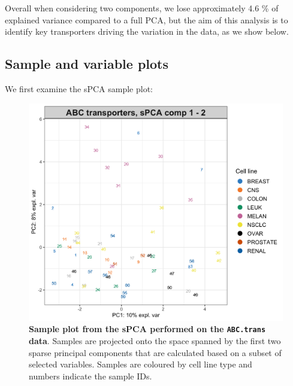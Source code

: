 \documentclass[]{book}
\newenvironment{Shaded}{\begin{snugshade}}{\end{snugshade}}
\newcommand{\CommentTok}[1]{\textcolor[rgb]{0.56,0.35,0.01}{\textit{#1}}}
\newcommand{\DataTypeTok}[1]{\textcolor[rgb]{0.13,0.29,0.53}{#1}}
\newcommand{\DecValTok}[1]{\textcolor[rgb]{0.00,0.00,0.81}{#1}}
\newcommand{\KeywordTok}[1]{\textcolor[rgb]{0.13,0.29,0.53}{\textbf{#1}}}
\newcommand{\NormalTok}[1]{#1}
\newcommand{\OperatorTok}[1]{\textcolor[rgb]{0.81,0.36,0.00}{\textbf{#1}}}
\newcommand{\OtherTok}[1]{\textcolor[rgb]{0.56,0.35,0.01}{#1}}
\newcommand{\StringTok}[1]{\textcolor[rgb]{0.31,0.60,0.02}{#1}}
\begin{document}
Overall when considering two components, we lose approximately 4.6 \% of explained variance compared to a full PCA, but the aim of this analysis is to identify key transporters driving the variation in the data, as we show below.

\hypertarget{sample-and-variable-plots}{%
\subsection{Sample and variable plots}\label{sample-and-variable-plots}}

We first examine the sPCA sample plot:

\begin{Shaded}
\end{Shaded}

\begin{figure}

{\centering \includegraphics[width=0.5\linewidth]{Figures/PCA/spca-ABCtrans-group-1} 

}

\caption{\textbf{Sample plot from the sPCA performed on the \texttt{ABC.trans} data}. Samples are projected onto the space spanned by the first two sparse principal components that are calculated based on a subset of selected variables. Samples are coloured by cell line type and numbers indicate the sample IDs.}\label{fig:spca-ABCtrans-group}
\end{figure}
\end{document}
